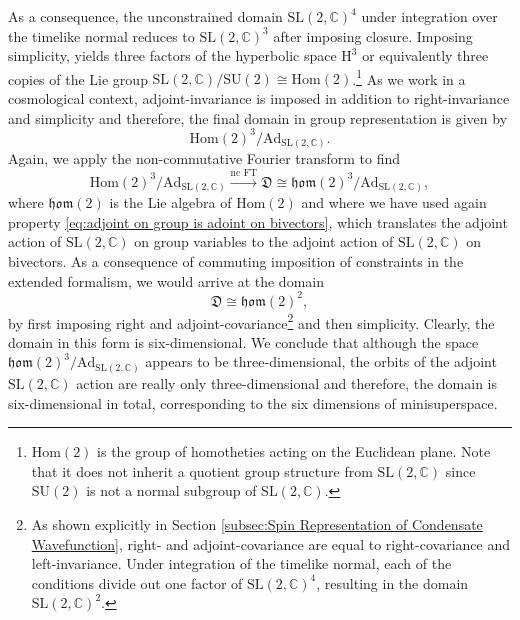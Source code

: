 \documentclass[11pt,a4paper]{article}
\newcommand{\C}{\mathbb C}
\newcommand{\SU}{\text{SU$(2)$}}
\newcommand{\SL}{\text{SL$(2,\C)$}}
\newcommand{\HH}{\text{H}^3}
\renewcommand{\hom}{\mathfrak{hom}(2)}
\newcommand{\Hom}{\text{Hom}(2)}
\begin{document}
As a consequence, the unconstrained domain $\SL^4$ under integration over the timelike normal reduces to $\SL^3$ after imposing closure. Imposing simplicity, yields three factors of the hyperbolic space $\HH$ or equivalently three copies of the Lie group $\SL/\SU \cong \Hom$.\footnote{$\Hom$ is the group of homotheties acting on the Euclidean plane. Note that it does not inherit a quotient group structure from $\SL$ since $\SU$ is not a normal subgroup of $\SL$.} As we work in a cosmological context, adjoint-invariance is imposed in addition to right-invariance and simplicity and therefore, the final domain in group representation is given by
%
\begin{equation}\label{eq:final domain in group variables}
\Hom^3/\text{Ad}_{\SL}.
\end{equation}
%
Again, we apply the non-commutative Fourier transform to find
%
\begin{equation}
\Hom^3/\text{Ad}_{\SL}\overset{\text{nc FT}}{\longrightarrow}\mathfrak{D}\cong \hom^3/\text{Ad}_{\SL},
\end{equation}
%
where $\hom$ is the Lie algebra of $\Hom$ and where we have used again property \eqref{eq:adjoint on group is adoint on bivectors}, which translates the adjoint action of $\SL$ on group variables to the adjoint action of $\SL$ on bivectors. As a consequence of commuting imposition of constraints in the extended formalism, we would arrive at the domain
%
\begin{equation}
\mathfrak{D}\cong \hom^2,
\end{equation}
%
by first imposing right and adjoint-covariance\footnote{As shown explicitly in Section \ref{subsec:Spin Representation of Condensate Wavefunction}, right- and adjoint-covariance are equal to right-covariance and left-invariance. Under integration of the timelike normal, each of the conditions divide out one factor of $\SL^4$, resulting in the domain $\SL^2$.} and then simplicity. Clearly, the domain in this form is six-dimensional. We conclude that although the space $\hom^3/\text{Ad}_{\SL}$ appears to be three-dimensional,  the orbits of the adjoint $\SL$ action are really only three-dimensional and therefore, the domain is six-dimensional in total, corresponding to the six dimensions of minisuperspace.
\end{document}
